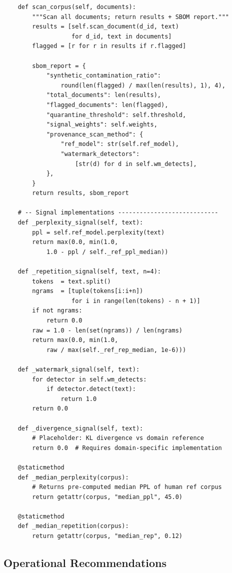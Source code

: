 \begin{lstlisting}
    def scan_corpus(self, documents):
        """Scan all documents; return results + SBOM report."""
        results = [self.scan_document(d_id, text)
                   for d_id, text in documents]
        flagged = [r for r in results if r.flagged]

        sbom_report = {
            "synthetic_contamination_ratio":
                round(len(flagged) / max(len(results), 1), 4),
            "total_documents": len(results),
            "flagged_documents": len(flagged),
            "quarantine_threshold": self.threshold,
            "signal_weights": self.weights,
            "provenance_scan_method": {
                "ref_model": str(self.ref_model),
                "watermark_detectors":
                    [str(d) for d in self.wm_detects],
            },
        }
        return results, sbom_report

    # -- Signal implementations ----------------------------
    def _perplexity_signal(self, text):
        ppl = self.ref_model.perplexity(text)
        return max(0.0, min(1.0,
            1.0 - ppl / self._ref_ppl_median))

    def _repetition_signal(self, text, n=4):
        tokens  = text.split()
        ngrams  = [tuple(tokens[i:i+n])
                   for i in range(len(tokens) - n + 1)]
        if not ngrams:
            return 0.0
        raw = 1.0 - len(set(ngrams)) / len(ngrams)
        return max(0.0, min(1.0,
            raw / max(self._ref_rep_median, 1e-6)))

    def _watermark_signal(self, text):
        for detector in self.wm_detects:
            if detector.detect(text):
                return 1.0
        return 0.0

    def _divergence_signal(self, text):
        # Placeholder: KL divergence vs domain reference
        return 0.0  # Requires domain-specific implementation

    @staticmethod
    def _median_perplexity(corpus):
        # Returns pre-computed median PPL of human ref corpus
        return getattr(corpus, "median_ppl", 45.0)

    @staticmethod
    def _median_repetition(corpus):
        return getattr(corpus, "median_rep", 0.12)
\end{lstlisting}

\subsection{Operational Recommendations}
\label{subsec:contamination-recommendations}

